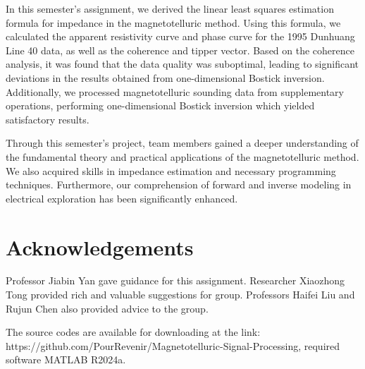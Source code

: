\documentclass[9pt,a4paper,twoside]{rho-class/rho}
\begin{document}
In this semester's assignment, we derived the linear least squares estimation formula for impedance in the magnetotelluric method. Using this formula, we calculated the apparent resistivity curve and phase curve for the 1995 Dunhuang Line 40 data, as well as the coherence and tipper vector. Based on the coherence analysis, it was found that the data quality was suboptimal, leading to significant deviations in the results obtained from one-dimensional Bostick inversion. Additionally, we processed magnetotelluric sounding data from supplementary operations, performing one-dimensional Bostick inversion which yielded satisfactory results.

Through this semester's project, team members gained a deeper understanding of the fundamental theory and practical applications of the magnetotelluric method. We also acquired skills in impedance estimation and necessary programming techniques. Furthermore, our comprehension of forward and inverse modeling in electrical exploration has been significantly enhanced.

\section{Acknowledgements}

Professor Jiabin Yan gave guidance for this assignment. Researcher Xiaozhong Tong provided rich and valuable suggestions for group. Professors Haifei Liu and Rujun Chen also provided advice to the group.

\begin{rhoenv}[frametitle=Code availability]
    The source codes are available for downloading at the link: https://github.com/PourRevenir/Magnetotelluric-Signal-Processing, required software MATLAB R2024a.
\end{rhoenv}

    
        
\end{document}
